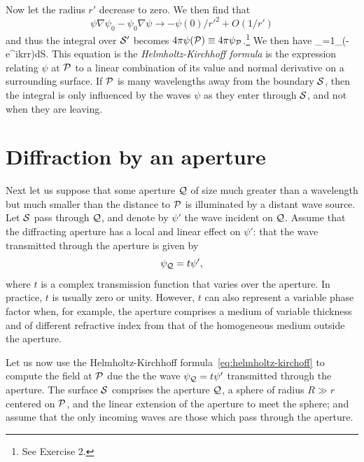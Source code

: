 Now let the radius $r'$ decrease to zero. We then find that 
\[
\psi\nabla\psi_0-\psi_0\nabla\psi\rightarrow {-\psi(0)/{r'}^2}+O({1/r'})
\]
and thus the integral over ${\cal S}'$ becomes $4\pi\psi({\cal P})\equiv
4\pi\psi_{\cal P}$.\footnote{See Exercise 2.} 
We then have
\be
\psi_={1\pi}\int_\left(\psi{}-{e^{ikr}\over r}\nabla\psi\right)\cdot d{\bm S}.
\label{eq:helmholtz-kirchoff}
\ee
%
This equation is the {\it Helmholtz-Kirchhoff formula} is the expression relating $\psi$ at 
${\cal P}$ to a linear combination of its value and normal derivative on a surrounding surface.
If ${\cal P}$ is many wavelengths away from the boundary ${\cal S}$, then the integral is only 
influenced by the waves $\psi$ as they enter through ${\cal S}$, and not when they are
leaving.

\section{Diffraction by an aperture}

Next let us suppose that some aperture ${\cal Q}$ of size much greater than a wavelength but
much smaller than the distance to ${\cal P}$ is illuminated by a distant wave source. Let 
${\cal S}$ pass through ${\cal Q}$, and denote by $\psi'$ the wave incident on ${\cal Q}$. Assume
that the diffracting aperture has a local and linear effect on $\psi'$: that the wave 
transmitted through the aperture is given by 
\[
\psi_{\cal Q}=t\psi',
\]
where $t$ is a complex transmission function that varies over the aperture. In practice, $t$
is usually zero or unity. However, $t$ can also represent a variable phase factor when, for
example, the aperture comprises a medium of variable thickness and of different refractive
index from that of the homogeneous medium outside the aperture.

Let us now use the Helmholtz-Kirchhoff formula~\ref{eq:helmholtz-kirchoff} to compute the field
at ${\cal P}$ due the the wave $\psi_{\cal Q}=t\psi'$ transmitted through the aperture. The
surface ${\cal S}$ comprises the aperture ${\cal Q}$, a sphere of radius $R\gg r$ centered on 
${\cal P}$, and the linear extension of the aperture to meet the sphere; and assume that the only
incoming waves are those which pass through the aperture. 

